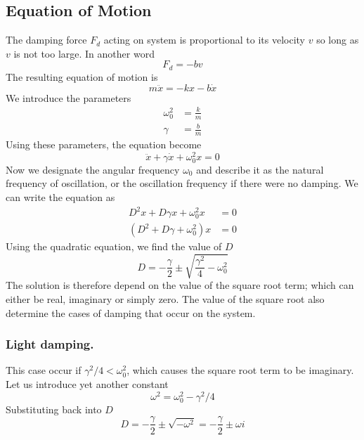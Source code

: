 \documentclass[../../../main.tex]{subfiles}
\begin{document}
\subsection*{Equation of Motion} 
The damping force $F_d$ acting on system is proportional to its velocity $v$ so long as $v$ is not too large. In another word
\begin{equation*}
    F_d=-bv
\end{equation*}
The resulting equation of motion is
\begin{equation*}
    m\ddot{x}=-kx-b\dot{x}
\end{equation*}
We introduce the parameters
\begin{align*}
    \omega_0^2&=\frac{k}{m}\\
    \gamma&=\frac{b}{m}
\end{align*}
Using these parameters, the equation become
\begin{equation*}
    \ddot{x}+\gamma\dot{x}+\omega_0^2 x=0
\end{equation*}
Now we designate the angular frequency $\omega_0$ and describe it as the natural frequency of oscillation, or the oscillation frequency if there were no damping. We can write the equation as\begin{align*}
    D^2x+D\gamma x+\omega_0^2x&=0\\
    (D^2+D\gamma +\omega_0^2)x&=0
\end{align*}
Using the quadratic equation, we find the value of $D$
\begin{equation*}
    D=-\frac{\gamma}{2}\pm \sqrt{\frac{\gamma^2}{4}-\omega_0^2}
\end{equation*}
The solution is therefore depend on the value of the square root term; which can either be real, imaginary or simply zero. The value of the square root also determine the cases of damping that occur on the system. 


\subsubsection*{Light damping.} This case occur if $\gamma^2/4<\omega_0^2$, which causes the square root term to be imaginary. Let us introduce yet another constant
\begin{equation*}
    \omega^2=\omega_0^2-\gamma^2/4
\end{equation*}
Substituting back into $D$
\begin{equation*}
    D=-\frac{\gamma}{2}\pm \sqrt{-\omega^2}=-\frac{\gamma}{2}\pm \omega i
\end{equation*}
\end{document}
